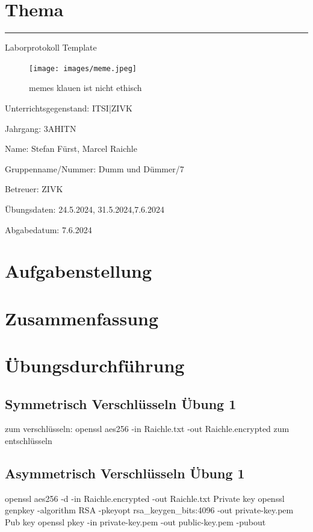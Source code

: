 \documentclass[a4paper]{article}
\begin{document}

\pagestyle{oida}
\section*{Thema}
\par\noindent\rule{\textwidth}{0.4pt}

Laborprotokoll
Template

\begin{figure}[h]
	\texttt{[image: images/meme.jpeg]}
	\caption{memes klauen ist nicht ethisch}
\end{figure}

\vspace*{\fill}
Unterrichtsgegenstand:	ITSI|ZIVK

Jahrgang:	3AHITN

Name:	Stefan Fürst, Marcel Raichle

Gruppenname/Nummer: Dumm und Dümmer/7

Betreuer: 	ZIVK

Übungsdaten:	24.5.2024, 31.5.2024,7.6.2024

Abgabedatum:	7.6.2024


\newpage
\tableofcontents

\newpage

\section{Aufgabenstellung}



\section{Zusammenfassung}


\newpage

\section{Übungsdurchführung}

\subsection{Symmetrisch Verschlüsseln Übung 1}
zum verschlüsseln:
openssl aes256 -in Raichle.txt -out Raichle.encrypted
zum entschlüsseln

\subsection{Asymmetrisch Verschlüsseln Übung 1}
openssl aes256 -d -in Raichle.encrypted -out Raichle.txt
Private key
openssl genpkey -algorithm RSA -pkeyopt rsa_keygen_bits:4096 -out private-key.pem
Pub key
openssl pkey -in private-key.pem -out public-key.pem -pubout
\end{document}
